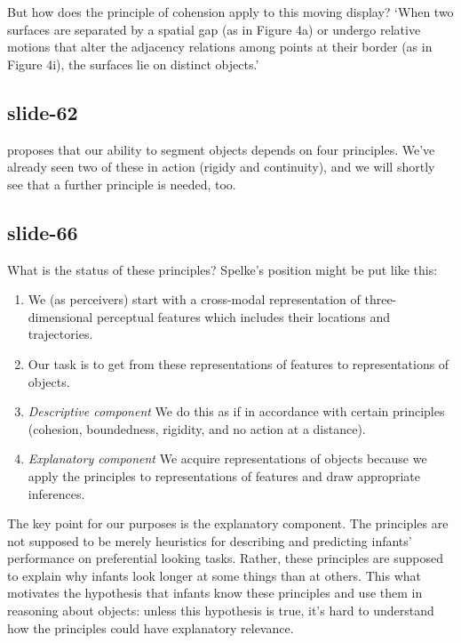 \documentclass[12pt,\papersize]{extarticle}
\begin{document}
But how does the principle of cohension apply to this moving display? ‘When two surfaces are separated by a spatial gap (as in Figure 4a) or undergo relative motions that alter the adjacency relations among points at their border (as in Figure 4i), the surfaces lie on distinct objects.’
 
 
\subsection{slide-62}
\citet{Spelke:1990jn} proposes that our ability to segment objects depends on four principles. We've already seen two of these in action (rigidy and continuity), and we will shortly see that a further principle is needed, too.
 
 
\subsection{slide-66}
What is the status of these principles?
Spelke’s position might be put like this:
\begin{enumerate}

\item We (as perceivers) start with a cross-modal representation of three-dimensional perceptual features which includes their locations and trajectories.

\item Our task is to get from these representations of features to representations of objects.

\item \emph{Descriptive component} We do this as if in accordance with certain principles (cohesion, boundedness, rigidity, and no action at a distance).

\item \emph{Explanatory component} We acquire representations of objects because we apply the principles to representations of features and draw appropriate inferences.

\end{enumerate}

The key point for our purposes is the explanatory component.
The principles are not supposed to be merely heuristics for describing and predicting infants’ performance on preferential looking tasks.
Rather, these principles are supposed to explain why infants look longer at some things than at others.
This what motivates the hypothesis that infants know these principles and use them in reasoning about objects: unless this hypothesis is true, it’s hard to understand how the principles could have explanatory relevance.
 
\end{document}
